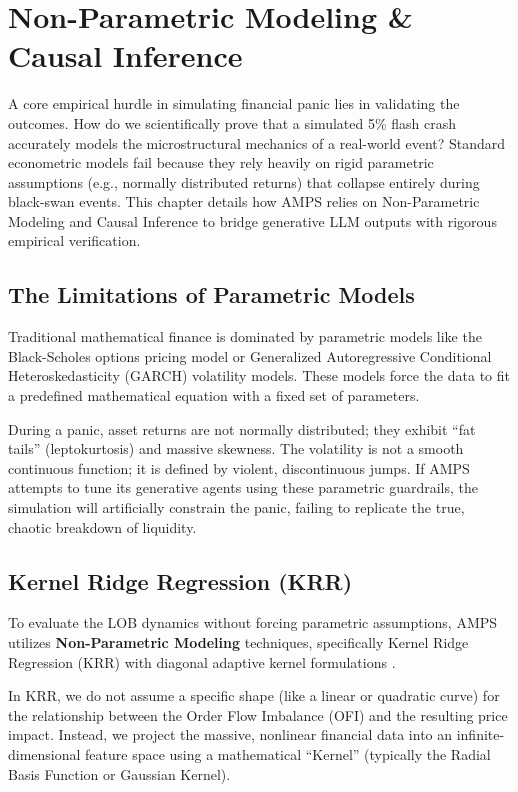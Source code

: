 \chapter{Non-Parametric Modeling \& Causal Inference}
\label{ch:non_parametric_modeling}

A core empirical hurdle in simulating financial panic lies in validating the outcomes. How do we scientifically prove that a simulated 5\% flash crash accurately models the microstructural mechanics of a real-world event? Standard econometric models fail because they rely heavily on rigid parametric assumptions (e.g., normally distributed returns) that collapse entirely during black-swan events. This chapter details how AMPS relies on Non-Parametric Modeling and Causal Inference to bridge generative LLM outputs with rigorous empirical verification.

\section{The Limitations of Parametric Models}

Traditional mathematical finance is dominated by parametric models like the Black-Scholes options pricing model or Generalized Autoregressive Conditional Heteroskedasticity (GARCH) volatility models. These models force the data to fit a predefined mathematical equation with a fixed set of parameters. 

During a panic, asset returns are not normally distributed; they exhibit ``fat tails'' (leptokurtosis) and massive skewness. The volatility is not a smooth continuous function; it is defined by violent, discontinuous jumps. If AMPS attempts to tune its generative agents using these parametric guardrails, the simulation will artificially constrain the panic, failing to replicate the true, chaotic breakdown of liquidity.

\section{Kernel Ridge Regression (KRR)}

To evaluate the LOB dynamics without forcing parametric assumptions, AMPS utilizes \textbf{Non-Parametric Modeling} techniques, specifically Kernel Ridge Regression (KRR) with diagonal adaptive kernel formulations \cite{li2025diagonal}.

In KRR, we do not assume a specific shape (like a linear or quadratic curve) for the relationship between the Order Flow Imbalance (OFI) and the resulting price impact. Instead, we project the massive, nonlinear financial data into an infinite-dimensional feature space using a mathematical ``Kernel'' (typically the Radial Basis Function or Gaussian Kernel). 


